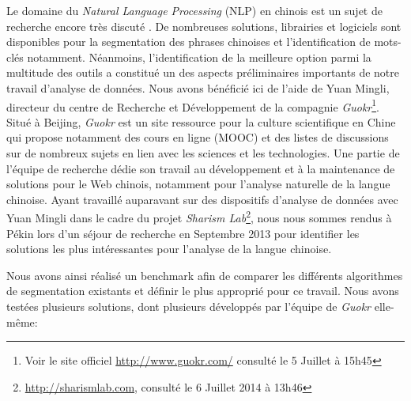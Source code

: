     Le domaine du \textit{Natural Language Processing} (NLP) en chinois est un sujet de recherche encore très discuté \citep{Qiu2013}. De nombreuses solutions, librairies et logiciels sont disponibles pour la segmentation des phrases chinoises et l'identification de mots-clés notamment. Néanmoins, l{\textquoteright}identification de la meilleure option parmi la multitude des outils a constitué un des aspects préliminaires importants de notre travail d{\textquoteright}analyse de données. Nous avons bénéficié ici de l'aide de Yuan Mingli, directeur du centre de Recherche et Développement de la compagnie \textit{Guokr}\footnote{Voir le site officiel \url{http://www.guokr.com/} consulté le 5 Juillet à 15h45}. Situé à Beijing, \textit{Guokr} est un site ressource pour la culture scientifique en Chine qui propose notamment des cours en ligne (MOOC) et des listes de discussions sur de nombreux sujets en lien avec les sciences et les technologies. Une partie de l'équipe de recherche dédie son travail au développement et à la maintenance de solutions pour le Web chinois, notamment pour l'analyse naturelle de la langue chinoise. Ayant travaillé auparavant sur des dispositifs d'analyse de données avec Yuan Mingli dans le cadre du projet \textit{Sharism Lab}\footnote{\url{http://sharismlab.com}, consulté le 6 Juillet 2014 à 13h46}, nous nous sommes rendus à Pékin lors d'un séjour de recherche en Septembre 2013 pour identifier les solutions les plus intéressantes pour l'analyse de la langue chinoise.

    Nous avons ainsi réalisé un benchmark afin de comparer les différents algorithmes de segmentation existants et définir le plus approprié pour ce travail. Nous avons testées plusieurs solutions, dont plusieurs développés par l'équipe de \textit{Guokr} elle-même:  

